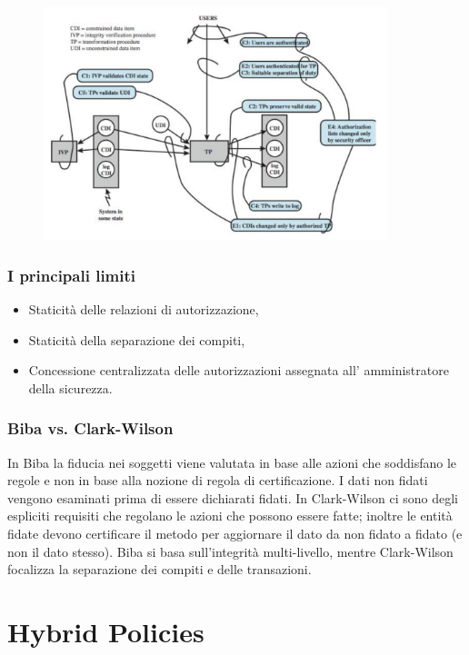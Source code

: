 \begin{figure}[H]
      \centering
      \includegraphics[width=10cm, keepaspectratio]{capitoli/policy/imgs/clark_wilson5.png}
\end{figure}

\subsubsection{I principali limiti}
\begin{itemize}
      \item Staticità delle relazioni di autorizzazione,
      \item Staticità della separazione dei compiti,
      \item Concessione centralizzata delle autorizzazioni assegnata all’
            amministratore della sicurezza.
\end{itemize}

\subsubsection{Biba vs. Clark-Wilson}
In Biba la fiducia nei soggetti viene valutata in base alle azioni
che soddisfano le regole e non in base alla nozione di regola di certificazione. 
I dati non fidati
vengono esaminati prima di essere dichiarati fidati. In Clark-Wilson ci sono 
degli espliciti requisiti
che regolano le azioni che possono essere fatte; inoltre le entità fidate devono 
certificare il metodo
per aggiornare il dato da non fidato a fidato (e non il dato stesso).
Biba si basa sull'integrità multi-livello, mentre Clark-Wilson focalizza la 
separazione dei compiti e
delle transazioni.


\section{Hybrid Policies}

